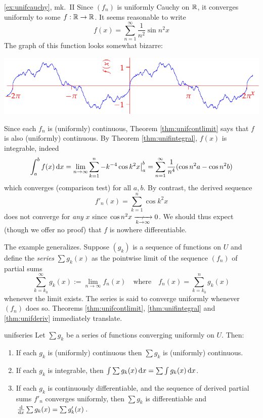 \begin{example*}{\ref{ex:unifcauchy}, mk.\ II}{}
Since $(f_n)$ is uniformly Cauchy on $\mathbb{R}$, it converges uniformly to some $f:\mathbb{R}\to\mathbb{R}$. It seems reasonable to write
\[f(x)=\sum\limits_{n=1}^\infty\frac 1{n^2}\sin n^2x\]
The graph of this function looks somewhat bizarre:
\begin{center}
\includegraphics{unifcauchy}
\end{center}
Since each $f_n$ is (uniformly) continuous, Theorem \ref{thm:unifcontlimit} says that $f$ is also (uniformly) continuous. By Theorem \ref{thm:unifintegral}, $f(x)$ is integrable, indeed
\[\int_a^bf(x)\,{\mathrm{d} x}=\lim_{n\to\infty}\sum_{k=1}^n -k^{-4}\cos k^2x\big|_a^b =\sum_{n=1}^\infty \frac 1{n^4}(\cos n^2a-\cos n^2b)\]
which converges (comparison test) for all $a,b$. By contrast, the derived sequence 
\[f'_n(x)=\sum\limits_{k=1}^n \cos k^2x\]
does not converge for \emph{any} $x$ since $\cos n^2x\nxrightarrow{k\to\infty} 0$. We should thus expect (though we offer no proof) that $f$ is nowhere differentiable.
\end{example*}



The example generalizes. Suppose $(g_k)$ is a sequence of functions on $U$ and define the \emph{series} $\sum g_k(x)$ as the pointwise limit of the sequence $(f_n)$ of partial sums
\[\sum_{k=k_0}^\infty g_k(x):=\lim\limits_{n\to\infty}f_n(x)\quad\text{where}\quad f_n(x)=\sum_{k=k_0}^ng_k(x)\]
whenever the limit exists. The series is said to converge uniformly whenever $(f_n)$ does so. Theorems \ref{thm:unifcontlimit}, \ref{thm:unifintegral} and \ref{thm:unifderiv} immediately translate.

\begin{cor}{}{unifseries}
Let $\sum g_k$ be a series of functions converging uniformly on $U$. Then:
\begin{enumerate}
  \item If each $g_k$ is (uniformly) continuous then $\sum g_k$ is (uniformly) continuous.
  \item If each $g_k$ is integrable, then $\int\sum g_k(x)\,{\mathrm{d} x}=\sum\int g_k(x)\,{\mathrm{d} x}$.
  \item If each $g_k$ is continuously differentiable, and the sequence of derived partial sums $f'_n$ converges uniformly, then $\sum g_k$ is differentiable and $\frac{\mathrm{d} }{\mathrm{d} x}\sum g_k(x)=\sum g'_k(x)$.
\end{enumerate}
\end{cor}\goodbreak

